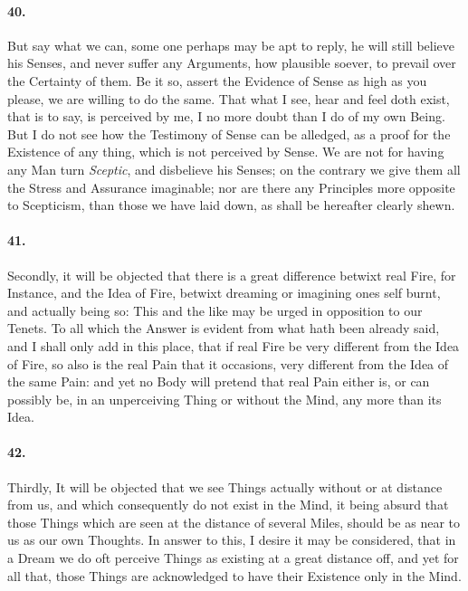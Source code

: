 \documentclass[]{article}
\newenvironment{sectionbody}{}{}
\begin{document}
\begin{sectionbody}
\paragraph{40.} But say what we can, some one perhaps may be apt to reply, he
will still believe his Senses, and never suffer any Arguments,
how plausible soever, to prevail over the Certainty of them.  Be
it so, assert the Evidence of Sense as high as you please, we are
willing to do the same.  That what I see, hear and feel doth
exist, that is to say, is perceived by me, I no more doubt than I
do of my own Being.  But I do not see how the Testimony of Sense
can be alledged, as a proof for the Existence of any thing, which
is not perceived by Sense.  We are not for having any Man turn
\emph{Sceptic}, and disbelieve his Senses; on the contrary we
give them all the Stress and Assurance imaginable; nor are there
any Principles more opposite to Scepticism, than those we have
laid down, as shall be hereafter clearly shewn.



\paragraph{41.} Secondly, it will be objected that there is a great difference
betwixt real Fire, for Instance, and the Idea of Fire, betwixt
dreaming or imagining ones self burnt, and actually being so:
This and the like may be urged in opposition to our Tenets.  To
all which the Answer is evident from what hath been already said,
and I shall only add in this place, that if real Fire be very
different from the Idea of Fire, so also is the real Pain that it
occasions, very different from the Idea of the same Pain: and yet
no Body will pretend that real Pain either is, or can possibly
be, in an unperceiving Thing or without the Mind, any more than
its Idea.



\paragraph{42.} Thirdly, It will be objected that we see Things actually without
or at distance from us, and which consequently do not exist in
the Mind, it being absurd that those Things which are seen at the
distance of several Miles, should be as near to us as our own
Thoughts.  In answer to this, I desire it may be considered, that
in a Dream we do oft perceive Things as existing at a great
distance off, and yet for all that, those Things are acknowledged
to have their Existence only in the Mind.




\end{sectionbody}
\end{document}
